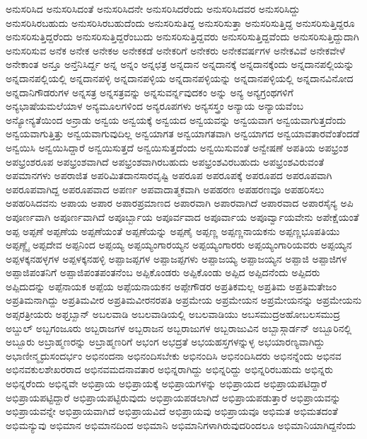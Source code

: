 {ಅನುಸರಿಸಿದ
ಅನುಸರಿಸಿದಂತೆ
ಅನುಸರಿಸಿದನೇ
ಅನುಸರಿಸಿದರೆಂದು
ಅನುಸರಿಸಿದವರ
ಅನುಸರಿಸಿದ್ದು
ಅನುಸರಿಸಿರಬಹುದು
ಅನುಸರಿಸಿರಬಹುದೆಂದು
ಅನುಸರಿಸುತಿದ್ದ
ಅನುಸರಿಸುತ್ತಾ
ಅನುಸರಿಸುತ್ತಿದ್ದ
ಅನುಸರಿಸುತ್ತಿದ್ದರೂ
ಅನುಸರಿಸುತ್ತಿದ್ದರೆಂದು
ಅನುಸರಿಸುತ್ತಿದ್ದರೆಂಬುದು
ಅನುಸರಿಸುತ್ತಿದ್ದವರು
ಅನುಸರಿಸುತ್ತಿದ್ದವೆಂದು
ಅನುಸರಿಸುತ್ತಿದ್ದುದಾಗಿ
ಅನುಸರಿಸುವ
ಅನೆಕ
ಅನೇಕ
ಅನೇಕಅ
ಅನೇಕಕಡೆ
ಅನೇಕರಿಗೆ
ಅನೇಕರು
ಅನೇಕವರ್ಷಗಳ
ಅನೇಕವಿವೆ
ಅನೇಕವೇಳೆ
ಅನೇಕಾಂತ
ಅನ್ತೂ
ಅನ್ತೆನಿಸಿರ್ದ್ದ
ಅನ್ನ
ಅನ್ನಂ
ಅನ್ನಛತ್ರ
ಅನ್ನದಾನ
ಅನ್ನದಾನಕ್ಕೆ
ಅನ್ನದಾನಕ್ಕೆಂದು
ಅನ್ನದಾನಪಲ್ಲಿಯನ್ನು
ಅನ್ನದಾನಪಲ್ಲಿಯಲ್ಲಿ
ಅನ್ನದಾನಪಳ್ಳಿ
ಅನ್ನದಾನಪಳ್ಳಿಯ
ಅನ್ನದಾನಪಳ್ಳಿಯನ್ನು
ಅನ್ನದಾನಪಳ್ಳಿಯಲ್ಲಿ
ಅನ್ನದಾನವಿನೋದ
ಅನ್ನದಾನಿಗೌಡರುಗಳ
ಅನ್ನಸತ್ರ
ಅನ್ನಸತ್ರವನ್ನು
ಅನ್ನಸುವರ್ನ್ನವುದಕಂ
ಅನ್ನು
ಅನ್ಯ
ಅನ್ಯಗ್ರಂಥಗಳಿಗೆ
ಅನ್ಯಭಾಷೆಯಮಲೆಯಾಳ
ಅನ್ಯಮೂಲಗಳಿಂದ
ಅನ್ಯರೂಪಗಳು
ಅನ್ಯಸಸ್ತ್ರಂ
ಅನ್ಯಾಯ
ಅನ್ಯಾಯವೆಂಬ
ಅನ್ಯೋನ್ಯತೆಯಿಂದ
ಅನ್ರಾಡು
ಅನ್ವಯ
ಅನ್ವಯಕ್ಕೆ
ಅನ್ವಯದ
ಅನ್ವಯವನ್ನು
ಅನ್ವಯವಾಗ
ಅನ್ವಯವಾಗುತ್ತದೆಂದು
ಅನ್ವಯವಾಗುತ್ತಿತ್ತು
ಅನ್ವಯವಾಗುವುದಿಲ್ಲ
ಅನ್ವಯಾಗತ
ಅನ್ವಯಾಗತವಾಗಿ
ಅನ್ವಯಾಗದ
ಅನ್ವಯಾವತಾರವೆಂತೆಂದಡೆ
ಅನ್ವಯಿಸಿ
ಅನ್ವಯಿಸಿದ್ದಾರೆ
ಅನ್ವಯಿಸುತ್ತದೆ
ಅನ್ವಯಿಸುತ್ತದೆಂದು
ಅನ್ವಯಿಸುವಂತೆ
ಅನ್ವೇಷಣೆ
ಅಪತಿಯ
ಅಪಭ್ರಂಶ
ಅಪಭ್ರಂಶರೂಪ
ಅಪಭ್ರಂಶವಾಗಿದೆ
ಅಪಭ್ರಂಶವಾಗಿರಬಹುದು
ಅಪಭ್ರಂಶವಿರಬಹುದು
ಅಪಭ್ರಂಶವಿರುವಂತೆ
ಅಪಮಾನಗಳು
ಅಪರಾಜಿತ
ಅಪರಿಮಿತದಾನಸಾರವೃಷ್ಟಿ
ಅಪರೂಪ
ಅಪರೂಪಕ್ಕೆ
ಅಪರೂಪದ
ಅಪರೂಪವಾಗಿ
ಅಪರೂಪವಾಗಿದ್ದ
ಅಪರೂಪವಾದ
ಅಪರ್ಣ
ಅಪವಾದಾತ್ಮಕವಾಗಿ
ಅಪಹರಣ
ಅಪಹರಣವೂ
ಅಪಹರಿಸಲು
ಅಪಹರಿಸಿದವನು
ಅಪಾಯ
ಅಪಾರ
ಅಪಾರಪ್ರಮಾಣದ
ಅಪಾರವಾಗಿ
ಅಪಾರವಾಗಿದೆ
ಅಪಾರವಾದ
ಅಪಾರಸೈನ್ಯ
ಅಪಿ
ಅಪೂರ್ಣವಾಗಿ
ಅಪೂರ್ಣವಾಗಿದೆ
ಅಪೂರ್ಬ್ಬಾಯ
ಅಪೂರ್ವವಾದ
ಅಪೂರ್ವಾಯ
ಅಪೂರ್ವ್ವಾಯವೇನು
ಅಪೇಕ್ಷೆಯಂತೆ
ಅಪ್ಪ
ಅಪ್ಪಣೆ
ಅಪ್ಪಣೆಯ
ಅಪ್ಪಣೆಯಂತೆ
ಅಪ್ಪಣೆಯನ್ನು
ಅಪ್ಪಣೈ
ಅಪ್ಪಣ್ಣ
ಅಪ್ಪಣ್ಣನಾಯಕನು
ಅಪ್ಪಣ್ಣಭೂಪತಿಯು
ಅಪ್ಪಣ್ಣೈ
ಅಪ್ಪದೇವ
ಅಪ್ಪನಿಂದ
ಅಪ್ಪಯ್ಯ
ಅಪ್ಪಯ್ಯಂಗಾರಯ್ಯನ
ಅಪ್ಪಯ್ಯಂಗಾರರು
ಅಪ್ಪಯ್ಯಂಗಾರಿಯವರು
ಅಪ್ಪಯ್ಯನ
ಅಪ್ಪಳಕ್ಕನಹಳ್ಳಗಳ
ಅಪ್ಪಳಕ್ಕನಹಳ್ಳಿ
ಅಪ್ಪಾಜಪ್ಪಗಳ
ಅಪ್ಪಾಜಪ್ಪಗಳು
ಅಪ್ಪಾಜಯ್ಯ
ಅಪ್ಪಾಜಯ್ಯನ
ಅಪ್ಪಾಜಿ
ಅಪ್ಪಾಜಿಗಳ
ಅಪ್ಪಾಜಿಪಂತನಿಗೆ
ಅಪ್ಪಾಜಿಪಂತಪಂತನೆಂಬ
ಅಪ್ಪಿಕೊಂಡರು
ಅಪ್ಪಿಕೊಂಡು
ಅಪ್ಪಿದ
ಅಪ್ಪಿದನೆಂದು
ಅಪ್ಪಿದರು
ಅಪ್ಪಿದುದನ್ನು
ಅಪ್ಪೆನಾಯಕ
ಅಪ್ಪೆಯ
ಅಪ್ಪೆಯನಾಯಕನ
ಅಪ್ಪೇಗೌಡರ
ಅಪ್ರತಿಕಮಲ್ಲ
ಅಪ್ರತಿಮ
ಅಪ್ರತಿಮತೇಜಂ
ಅಪ್ರತಿಮನಾಗಿದ್ದು
ಅಪ್ರತಿಮವೀರ
ಅಪ್ರತಿಮವೀರನರಪತಿ
ಅಪ್ರಮೇಯ
ಅಪ್ರಮೇಯನ
ಅಪ್ರಮೇಯನನ್ನು
ಅಪ್ರಮೇಯನು
ಅಪ್ಸರತ್ರೀಯರು
ಅಫ್ತಬ್ಖಾನ್
ಅಬಲವಾಡಿ
ಅಬಲವಾಡಿಯಲ್ಲಿ
ಅಬಲವಾಡಿಯು
ಅಬಸಮುದ್ರಅಹೋಬಲಸಮುದ್ರ
ಅಬ್ದುಲ್
ಅಬ್ಬಗಂಜೂರು
ಅಬ್ಬರಾಜಗಳ
ಅಬ್ಬರಾಜನ
ಅಬ್ಬರಾಜುಗಳ
ಅಬ್ಬರಾಜುವಿನ
ಅಬ್ಬಾಸ್ಗಾರ್ಡನ್
ಅಬ್ಬೂರಿನಲ್ಲಿ
ಅಬ್ಬೂರು
ಅಬ್ರಾಹ್ಮಣರನ್ನು
ಅಬ್ರಾಹ್ಮಣರಿಗೆ
ಅಭಂಗ
ಅಭದ್ರತೆ
ಅಭಯಹಸ್ತಗಳನ್ನುಳ್ಳ
ಅಭಯಾರಣ್ಯವಾಗಿದ್ದು
ಅಭಾಣೀನ್ಮೃದುಸಂದರ್ಭಂ
ಅಭಿನಂದನಾ
ಅಭಿನಂದಿಸಬೇಕು
ಅಭಿನಂದಿಸಿ
ಅಭಿನಂದಿಸಿದರು
ಅಭಿನನ್ನೆಂದು
ಅಭಿನವ
ಅಭಿನವಕುಲಶೇಖರರಾದ
ಅಭಿನವಮದನಾವತಾರ
ಅಭಿನ್ನರಾಗಿದ್ದು
ಅಭಿನ್ನರಿದ್ದು
ಅಭಿನ್ನರಿರಬಹುದು
ಅಭಿನ್ನರು
ಅಭಿನ್ನರೆಂದು
ಅಭಿನ್ನವೇ
ಅಭಿಪ್ರಾಯ
ಅಭಿಪ್ರಾಯಕ್ಕೆ
ಅಭಿಪ್ರಾಯಗಳನ್ನು
ಅಭಿಪ್ರಾಯದ
ಅಭಿಪ್ರಾಯಪಟಿದ್ದಾರೆ
ಅಭಿಪ್ರಾಯಪಟ್ಟಿದ್ದಾರೆ
ಅಭಿಪ್ರಾಯಪಟ್ಟಿರುವುದು
ಅಭಿಪ್ರಾಯಪಡಲಾಗಿದೆ
ಅಭಿಪ್ರಾಯಪಡುತ್ತಾರೆ
ಅಭಿಪ್ರಾಯವನ್ನು
ಅಭಿಪ್ರಾಯವನ್ನೇ
ಅಭಿಪ್ರಾಯವಾಗಿದೆ
ಅಭಿಪ್ರಾಯವಿದೆ
ಅಭಿಪ್ರಾಯವು
ಅಭಿಪ್ರಾಯವೂ
ಅಭಿಮತ
ಅಭಿಮತದಂತೆ
ಅಭಿಮನ್ಯುವು
ಅಭಿಮಾನ
ಅಭಿಮಾನದಿಂದ
ಅಭಿಮಾನಿ
ಅಭಿಮಾನಿಗಳಾಗಿರುವುದರಿಂದಲೂ
ಅಭಿಮಾನಿಯಾಗಿದ್ದನೆಂದು
}
